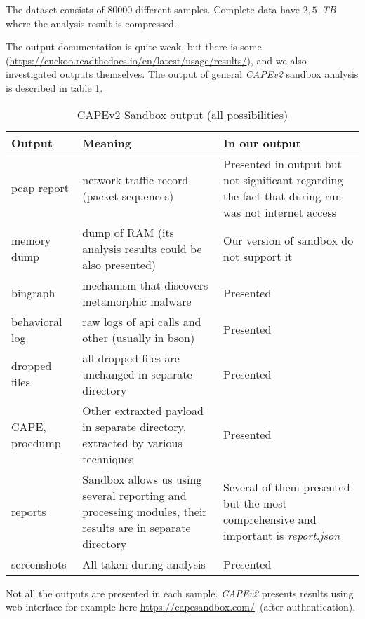 The dataset consists of $80000$ different samples. Complete data have \texttildelow$2,5$~\emph{TB} where the analysis result is compressed.

The output documentation is quite weak, but there is some (\url{https://cuckoo.readthedocs.io/en/latest/usage/results/}), and we also investigated outputs themselves. The output of general \emph{CAPEv2} sandbox analysis is described in table \ref{tab:sandbox-out}.

\begin{table}[h]
    \centering
    \caption{CAPEv2 Sandbox output (all possibilities)}
    \begin{tabular}{p{2cm}p{6cm}p{6cm}} 
        \toprule
        \textbf{Output} &
        \textbf{Meaning} &
        \textbf{In our output} \\
        \midrule
        pcap report & network traffic record (packet sequences) & Presented in output but not significant regarding the fact that during run was not internet access \\
        \midrule
        memory dump & dump of RAM (its analysis results could be also presented)& Our version of sandbox do not support it \\
        \midrule
        bingraph & mechanism that discovers metamorphic malware \cite{Kwon2012}& Presented\\
        \midrule
        behavioral log & raw logs of api calls and other (usually in bson) & Presented \\
        \midrule
        dropped files & all dropped files are unchanged in separate directory & Presented \\
        \midrule
        CAPE, procdump & Other extraxted payload in separate directory, extracted by various techniques \cite{Cape} & Presented \\
        \midrule
        reports & Sandbox allows us using several reporting and processing modules, their results are in separate directory  & Several of them presented but the most comprehensive and important is \emph{report.json} \\
        \midrule
        screenshots & All taken during analysis  & Presented \\
        \bottomrule
    \end{tabular}
    \label{tab:sandbox-out}
\end{table}

Not all the outputs are presented in each sample. \emph{CAPEv2} presents results using web interface for example here \url{https://capesandbox.com/}~(after authentication).

